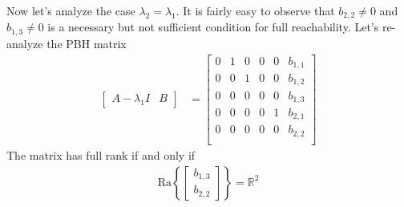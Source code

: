 \documentclass[twoside]{article}
\begin{document}
Now let's analyze the case $\lambda_2 = \lambda_1$. It is fairly easy 
to observe that $b_{2,2} \neq 0$ and $b_{1,3} \neq 0$ is a necessary
but not sufficient condition for full reachability. Let's re-analyze the
PBH matrix
%
\begin{align*}
  \left[ \begin{array}{c|c} A - \lambda_1 I & B \end{array} \right]
  &= \left[  \begin{array}{ccc|cc|c} 0 & 1 & 0 & 0 & 0 & b_{1,1} \\
     0 & 0 & 1 & 0 & 0 & b_{1,2}
    \\
    0 & 0 & 0 &  0 & 0 & b_{1,3 }\\
    \hline
    0 & 0 & 0 & 0 & 1 & b_{2,1} \\
    0 & 0 & 0 & 0 & 0 & b_{2,2}   \\
    \end{array} \right]
\end{align*}
%
The matrix has full rank if and only if 
%
\begin{align*}
 \mathrm{Ra}\left\lbrace 
 \begin{bmatrix}
     b_{1,3}
     \\
     b_{2,2}
 \end{bmatrix}
 \right\rbrace = \mathbb{R}^2
\end{align*}
%

\end{document}
